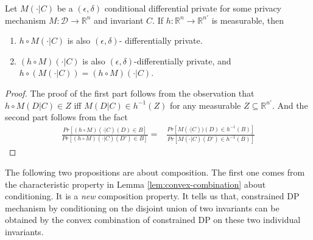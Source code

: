 \documentclass[11pt]{article}
\begin{document}

\begin{lemma} \label{lem:postprocessing-conditioning}   Let $M(\cdot | C)$ be a $(\epsilon, \delta)$ conditional differential private for some privacy mechanism $M: \mathcal{D}\rightarrow \mathbb{R}^n$ and invariant $C$.  If $h: \mathbb{R}^n\rightarrow \mathbb{R}^{n'}$ is measurable, then 
	\begin{enumerate}
		\item $h \circ M(\cdot |C)$ is also $(\epsilon, \delta)$- differentially private. 
		\item  $(h\circ M)(\cdot|C)$ is also $(\epsilon,\delta)$-differentially private, and $h\circ (M(\cdot |C))= (h\circ M)(\cdot|C)$. 
	\end{enumerate}
\end{lemma}

\begin{proof} The proof of the first part follows from the observation that $h\circ M(D | C) \in Z $ iff $M(D | C) \in h^{-1}(Z)$ for any measurable $Z\subseteq \mathbb{R}^{n'}$.  And the second part follows from the fact 
\begin{align}
		\frac{Pr[(h\circ M)(\cdot|C) (D)\in B]}{Pr[(h\circ M)(\cdot|C) (D')\in B]} = & \frac{Pr[ M(\cdot|C)) (D)\in h^{-1}(B)]}{Pr[ M(\cdot|C) (D')\in h^{-1}(B)]} \nonumber
	\end{align} 
\end{proof}




The following two propositions are about composition. The first one comes from the characteristic property in Lemma \ref{lem:convex-combination} about conditioning.  It is a \emph{new} composition property.  It tells us that, constrained DP mechanism by conditioning on the disjoint union of two invariants can be obtained by the convex combination of constrained DP on these two individual invariants. 
\end{document}
